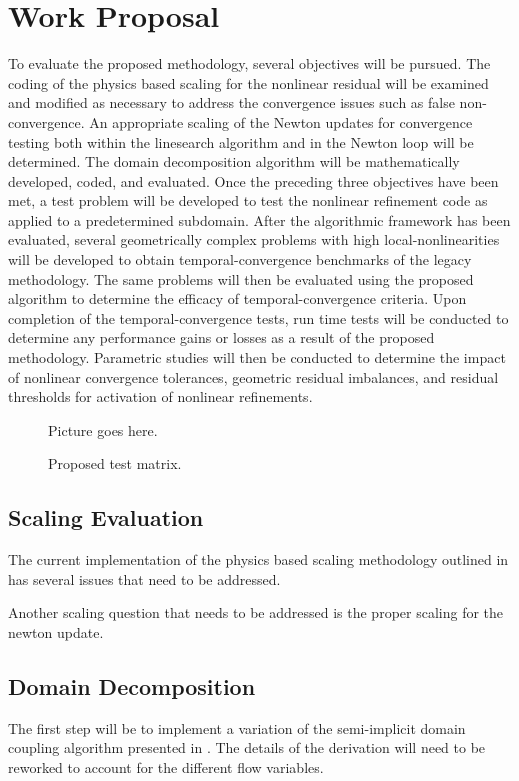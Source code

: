 \chapter{Work Proposal}
\label{chap:proposal}
To evaluate the proposed methodology, several objectives will be pursued.
The coding of the physics based scaling for the nonlinear residual will be examined and modified as necessary to address the convergence issues such as false non-convergence.
An appropriate scaling of the Newton updates for convergence testing both within the linesearch algorithm and in the Newton loop will be determined.
The domain decomposition algorithm will be mathematically developed, coded, and evaluated.
Once the preceding three objectives have been met, a test problem will be developed to test the nonlinear refinement code as applied to a predetermined subdomain.
After the algorithmic framework has been evaluated, several geometrically complex problems with high local-nonlinearities will be developed to obtain temporal-convergence benchmarks of the legacy methodology.
The same problems will then be evaluated using the proposed algorithm to determine the efficacy of temporal-convergence criteria.
Upon completion of the temporal-convergence tests, run time tests will be conducted to determine any performance gains or losses as a result of the proposed methodology.
Parametric studies will then be conducted to determine the impact of nonlinear convergence tolerances, geometric residual imbalances, and residual thresholds for activation of nonlinear refinements.



\begin{figure}[ht]
\caption{Proposed test matrix.}
\label{fig:test_matrix}
\begin{center}
Picture goes here.
\end{center}
\end{figure}

\section{Scaling Evaluation}
\label{sect:proposal_scaling}
The current implementation of the physics based scaling methodology outlined in  has several issues that need to be addressed.

Another scaling question that needs to be addressed is the proper scaling for the newton update.

\section{Domain Decomposition}
\label{sect:domain_coupling}
The first step will be to implement a variation of the semi-implicit domain coupling algorithm presented in .
The details of the derivation will need to be reworked to account for the different flow variables.

